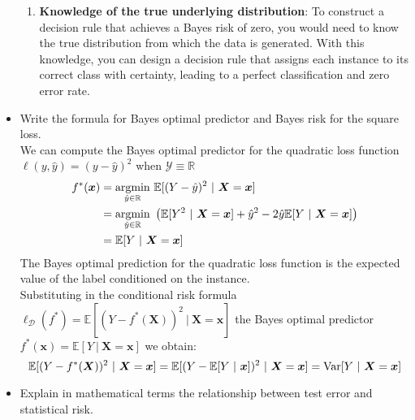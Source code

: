 \begin{itemize}
\begin{enumerate}
            \item \textbf{Knowledge of the true underlying distribution}: To construct a decision rule that achieves a Bayes risk of zero, you would need to know the true distribution from which the data is generated. With this knowledge, you can design a decision rule that assigns each instance to its correct class with certainty, leading to a perfect classification and zero error rate.
        \end{enumerate}
        
    \item Write the formula for Bayes optimal predictor and Bayes risk for the square loss.\\

        We can compute the Bayes optimal predictor for the quadratic loss function $\ell(y, \hat{y}) = (y - \hat{y})^{2}$ when $\mathcal{Y} \equiv \mathbb{R}$\\
        \begin{equation} 
            \begin{split}
                f^{*}(\boldsymbol{x}) & = \underset{\hat{y} \in \mathbb{R}}{\textmd{argmin}}\ \mathbb{E}[(Y - \hat{y})^{2}\ |\ \boldsymbol{X} = \boldsymbol{x}]\\
                                      & = \underset{\hat{y} \in \mathbb{R}}{\textmd{argmin}}\ \left( \mathbb{E}[Y^{2}\ |\ \boldsymbol{X} = \boldsymbol{x}] + \hat{y}^{2} - 2\hat{y} \mathbb{E}[Y\ |\ \boldsymbol{X} = \boldsymbol{x}]\right)\\ 
                                      & = \mathbb{E}[Y\ |\ \boldsymbol{X} = \boldsymbol{x}]\\
            \end{split}
        \end{equation}
        The Bayes optimal prediction for the quadratic loss function is the expected value of the label conditioned on the instance.\\
        Substituting in the conditional risk formula $\ell_{\mathcal{D}}(f^{*}) = \mathbb{E}[(Y - f^{*}(\boldsymbol{X}))^{2}\ |\ \boldsymbol{X} = \boldsymbol{x}]$ the Bayes optimal predictor $f^{*}(\boldsymbol{x}) = \mathbb{E}[Y\ |\ \boldsymbol{X} = \boldsymbol{x}]$ we obtain:
        $$
        \mathbb{E}[(Y - f^{*}(\boldsymbol{X}))^{2}\ |\ \boldsymbol{X} = \boldsymbol{x}] = \mathbb{E}[(Y - \mathbb{E}[Y\ |\ \boldsymbol{x}])^{2}\ |\ \boldsymbol{X} = \boldsymbol{x}] = \textmd{Var}[Y\ |\ \boldsymbol{X} = \boldsymbol{x}]
        $$

        \item Explain in mathematical terms the relationship between test error and statistical risk.\\
            

\end{itemize}
